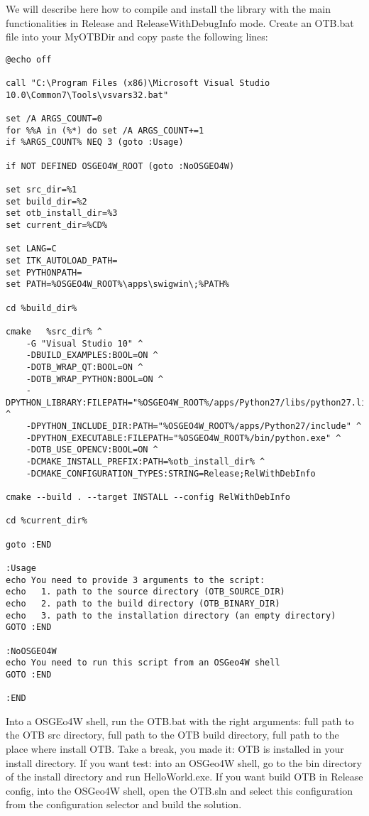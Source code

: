 
We will describe here how to compile and install the library with the main functionalities in Release and ReleaseWithDebugInfo mode.
Create an OTB.bat file into your MyOTBDir and copy paste the following lines:

\begin{verbatim}
@echo off

call "C:\Program Files (x86)\Microsoft Visual Studio 10.0\Common7\Tools\vsvars32.bat"

set /A ARGS_COUNT=0    
for %%A in (%*) do set /A ARGS_COUNT+=1  
if %ARGS_COUNT% NEQ 3 (goto :Usage)

if NOT DEFINED OSGEO4W_ROOT (goto :NoOSGEO4W)
	
set src_dir=%1
set build_dir=%2
set otb_install_dir=%3
set current_dir=%CD%

set LANG=C
set ITK_AUTOLOAD_PATH=
set PYTHONPATH=
set PATH=%OSGEO4W_ROOT%\apps\swigwin\;%PATH%

cd %build_dir%

cmake 	%src_dir% ^
	-G "Visual Studio 10" ^
	-DBUILD_EXAMPLES:BOOL=ON ^
	-DOTB_WRAP_QT:BOOL=ON ^
	-DOTB_WRAP_PYTHON:BOOL=ON ^
	-DPYTHON_LIBRARY:FILEPATH="%OSGEO4W_ROOT%/apps/Python27/libs/python27.lib" ^
	-DPYTHON_INCLUDE_DIR:PATH="%OSGEO4W_ROOT%/apps/Python27/include" ^
	-DPYTHON_EXECUTABLE:FILEPATH="%OSGEO4W_ROOT%/bin/python.exe" ^
	-DOTB_USE_OPENCV:BOOL=ON ^
	-DCMAKE_INSTALL_PREFIX:PATH=%otb_install_dir% ^
	-DCMAKE_CONFIGURATION_TYPES:STRING=Release;RelWithDebInfo

cmake --build . --target INSTALL --config RelWithDebInfo

cd %current_dir%

goto :END

:Usage
echo You need to provide 3 arguments to the script: 
echo   1. path to the source directory (OTB_SOURCE_DIR)
echo   2. path to the build directory (OTB_BINARY_DIR)
echo   3. path to the installation directory (an empty directory)
GOTO :END

:NoOSGEO4W
echo You need to run this script from an OSGeo4W shell
GOTO :END

:END
\end{verbatim}
Into a OSGEo4W shell, run the OTB.bat with the right arguments: full path to the OTB src directory, full path to the OTB build directory, full path to the place where install OTB. Take a break, you made it: OTB is installed in your install directory. If you want test: into an OSGeo4W shell, go to the bin directory of the install directory and run HelloWorld.exe. If you want build OTB in Release config, into the OSGeo4W shell, open the OTB.sln and select this configuration from the configuration selector and build the solution.

